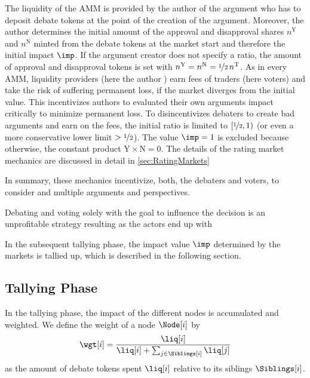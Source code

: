 \documentclass[%
aip,
amsmath,amssymb,
reprint,%
unsortedaddress,
nofootinbib
]{revtex4-2}
\newcommand{\T}{\text{T}}
\newcommand{\Y}{\text{Y}}
\newcommand{\N}{\text{N}}
\begin{document}
The liquidity of the \ac{AMM} is provided by the author of the argument who has to deposit debate tokens at the point of the creation of the argument.
Moreover, the author determines the initial amount of the approval and disapproval shares $n^\Y$ and $n^\N$ minted from the debate tokens at the market start
and therefore the initial impact $\imp$.
If the argument creator does not specify a ratio, 
the amount of approval and disapproval tokens is set with $n^\Y=n^\N=\nicefrac{1}{2}\,n^\T$. 
As in every \ac{AMM}, liquidity providers (here the author )
earn fees of traders (here voters)
and 
take the risk of suffering permanent loss, if the market diverges from the initial value.
This incentivizes authors to evaluated their own arguments impact critically 
to minimize permanent loss. 
To disincentivizes debaters to create bad arguments and earn on the fees,
the initial ratio is limited to $[\nicefrac{1}{2},1)$ (or even a more conservative lower limit $>\nicefrac{1}{2}$).
The value $\imp=1$ is excluded because otherwise, the constant product $\Y\times \N = 0$.
The details of the rating market mechanics are discussed in detail in \cref{sec:RatingMarkets}

In summary, these mechanics incentivize, both, the debaters and voters, to consider and multiple arguments and perspectives.
 
Debating and voting solely with the goal to influence the decision is an unprofitable  strategy resulting
as the actors end up with 

In the subsequent tallying phase,
the impact value $\imp$ determined by the markets is tallied up,
which is described in the following section.


\subsection{Tallying Phase}\label{sec:TallyingPhase}
In the tallying phase, the impact of the different nodes is accumulated and weighted.
We define the weight of a node $\Node[i]$ by
\begin{equation}
	\wgt[i] = \frac{\liq[i]}{\liq[i]+\sum_{j\in \Siblings[i]}\liq[j]}
\end{equation}
as the amount of debate tokens spent $\liq[i]$ relative to its siblings $\Siblings[i]$.
\end{document}
